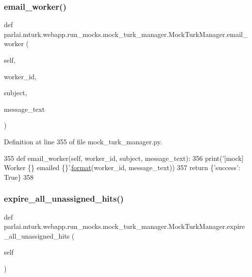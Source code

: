 \subsubsection{\texorpdfstring{email\+\_\+worker()}{email\_worker()}}
{\footnotesize\ttfamily def parlai.\+mturk.\+webapp.\+run\+\_\+mocks.\+mock\+\_\+turk\+\_\+manager.\+Mock\+Turk\+Manager.\+email\+\_\+worker (\begin{DoxyParamCaption}\item[{}]{self,  }\item[{}]{worker\+\_\+id,  }\item[{}]{subject,  }\item[{}]{message\+\_\+text }\end{DoxyParamCaption})}



Definition at line 355 of file mock\+\_\+turk\+\_\+manager.\+py.


\begin{DoxyCode}
355     \textcolor{keyword}{def }email\_worker(self, worker\_id, subject, message\_text):
356         print(\textcolor{stringliteral}{'[mock] Worker \{\} emailed \{\}'}.\hyperlink{namespaceparlai_1_1chat__service_1_1services_1_1messenger_1_1shared__utils_a32e2e2022b824fbaf80c747160b52a76}{format}(worker\_id, message\_text))
357         \textcolor{keywordflow}{return} \{\textcolor{stringliteral}{'success'}: \textcolor{keyword}{True}\}
358 \end{DoxyCode}
\mbox{\label{classparlai_1_1mturk_1_1webapp_1_1run__mocks_1_1mock__turk__manager_1_1MockTurkManager_a7e68c784f69799ce3fe4b60fc48552ba}} 
\subsubsection{\texorpdfstring{expire\+\_\+all\+\_\+unassigned\+\_\+hits()}{expire\_all\_unassigned\_hits()}}
{\footnotesize\ttfamily def parlai.\+mturk.\+webapp.\+run\+\_\+mocks.\+mock\+\_\+turk\+\_\+manager.\+Mock\+Turk\+Manager.\+expire\+\_\+all\+\_\+unassigned\+\_\+hits (\begin{DoxyParamCaption}\item[{}]{self }\end{DoxyParamCaption})}



